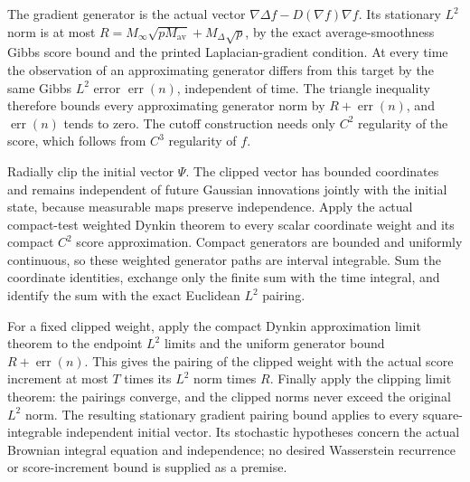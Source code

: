 \documentclass[11pt,a4paper]{article}
\begin{document}
The gradient generator is the actual vector \(\nabla\Delta f-D(\nabla f)\nabla f\). Its stationary \(L^{2}\) norm is at most \(R=M_\infty\sqrt{pM_{\mathrm{av}}}+M_\Delta\sqrt p\), by the exact average-smoothness Gibbs score bound and the printed Laplacian-gradient condition. At every time the observation of an approximating generator differs from this target by the same Gibbs \(L^{2}\) error \(\operatorname{err}(n)\), independent of time. The triangle inequality therefore bounds every approximating generator norm by \(R+\operatorname{err}(n)\), and \(\operatorname{err}(n)\) tends to zero. The cutoff construction needs only \(C^{2}\) regularity of the score, which follows from \(C^{3}\) regularity of \(f\).



Radially clip the initial vector \(\Psi\). The clipped vector has bounded coordinates and remains independent of future Gaussian innovations jointly with the initial state, because measurable maps preserve independence. Apply the actual compact-test weighted Dynkin theorem to every scalar coordinate weight and its compact \(C^{2}\) score approximation. Compact generators are bounded and uniformly continuous, so these weighted generator paths are interval integrable. Sum the coordinate identities, exchange only the finite sum with the time integral, and identify the sum with the exact Euclidean \(L^{2}\) pairing.



For a fixed clipped weight, apply the compact Dynkin approximation limit theorem to the endpoint \(L^{2}\) limits and the uniform generator bound \(R+\operatorname{err}(n)\). This gives the pairing of the clipped weight with the actual score increment at most \(T\) times its \(L^{2}\) norm times \(R\). Finally apply the clipping limit theorem: the pairings converge, and the clipped norms never exceed the original \(L^{2}\) norm. The resulting stationary gradient pairing bound applies to every square-integrable independent initial vector. Its stochastic hypotheses concern the actual Brownian integral equation and independence; no desired Wasserstein recurrence or score-increment bound is supplied as a premise.
\end{document}
